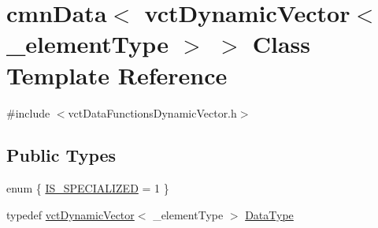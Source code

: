 \hypertarget{classcmn_data_3_01vct_dynamic_vector_3_01__element_type_01_4_01_4}{}\section{cmn\+Data$<$ vct\+Dynamic\+Vector$<$ \+\_\+element\+Type $>$ $>$ Class Template Reference}
\label{classcmn_data_3_01vct_dynamic_vector_3_01__element_type_01_4_01_4}


{\ttfamily \#include $<$vct\+Data\+Functions\+Dynamic\+Vector.\+h$>$}

\subsection*{Public Types}
\begin{DoxyCompactItemize}
\item 
enum \{ \hyperlink{classcmn_data_3_01vct_dynamic_vector_3_01__element_type_01_4_01_4_a05c6f7604114348b65088b0b7724a152aca16809e1c2c0a0930f412fea81a9582}{I\+S\+\_\+\+S\+P\+E\+C\+I\+A\+L\+I\+Z\+E\+D} = 1
 \}
\item 
typedef \hyperlink{classvct_dynamic_vector}{vct\+Dynamic\+Vector}$<$ \+\_\+element\+Type $>$ \hyperlink{classcmn_data_3_01vct_dynamic_vector_3_01__element_type_01_4_01_4_a00a493d9c26fcb200ced1375b3500d17}{Data\+Type}
\end{DoxyCompactItemize}

